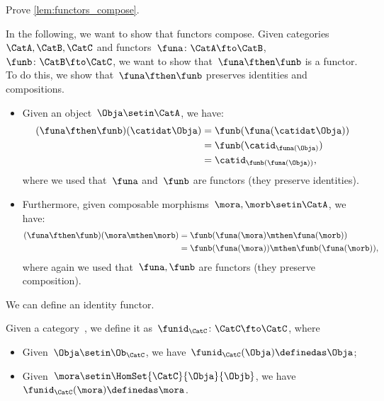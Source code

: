 \begin{exercise}
    Prove \cref{lem:functors_compose}.
\end{exercise}
\begin{solution}
    In the following, we want to show that functors compose.
    Given categories~$\CatA,\CatB,\CatC$ and functors~$\funa\colon \CatA\fto \CatB$,~$\funb \colon \CatB\fto \CatC$, we want to show that~$\funa\fthen\funb$ is a functor.
    To do this, we show that~$\funa\fthen\funb$ preserves identities and compositions.
    \begin{itemize}
        \item Given an object~$\Obja\setin \CatA$, we have:
              \begin{equation}
                  \begin{aligned}
                      (\funa\fthen\funb)(\catidat\Obja)
                       & =\funb(\funa(\catidat\Obja)) \\
                       & =\funb(\catid_{\funa(\Obja)}) \\
                       & =\catid_{\funb(\funa(\Obja))},
                  \end{aligned}
              \end{equation}
              where we used that~$\funa$ and~$\funb$ are functors (they preserve identities).
        \item Furthermore, given composable morphisms~$\mora,\morb\setin \CatA$, we have:
              \begin{equation}
                  \begin{aligned}
                      (\funa\fthen\funb)(\mora\mthen\morb)
                       & =\funb(\funa(\mora)\mthen \funa(\morb)) \\
                       & =\funb(\funa(\mora))\mthen \funb(\funa(\morb)),
                  \end{aligned}
              \end{equation}
              where again we used that~$\funa,\funb$ are functors (they preserve composition).
    \end{itemize}
\end{solution}

We can define an identity functor.

\begin{ctdefinition}
    \label{def:identity_functor}
    Given a category~\CatC, we define it as~$\funid_\CatC\colon \CatC \fto \CatC$, where
    \begin{itemize}
        \item Given~$\Obja\setin \Ob_\CatC$, we have~$\funid_\CatC(\Obja)\definedas \Obja$;
        \item Given~$\mora \setin \HomSet{\CatC}{\Obja}{\Objb}$, we have~$\funid_\CatC(\mora)\definedas \mora$.
    \end{itemize}
\end{ctdefinition}

